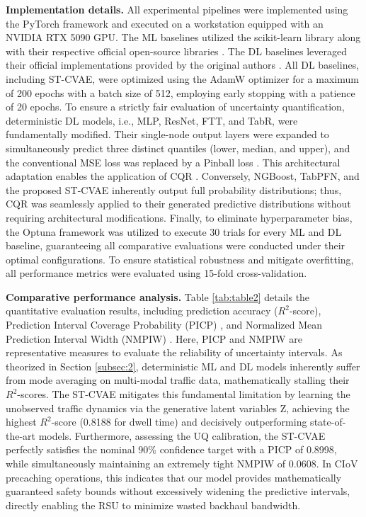 \documentclass[journal]{IEEEtran}
\begin{document}
\textbf{Implementation details.}
All experimental pipelines were implemented using the PyTorch framework and executed on a workstation equipped with an NVIDIA RTX 5090 GPU.
The ML baselines utilized the scikit-learn library along with their respective official open-source libraries \cite{a1, a2, a3}.
The DL baselines leveraged their official implementations provided by the original authors \cite{a4, a5, a6}.
All DL baselines, including ST-CVAE, were optimized using the AdamW optimizer \cite{x9} for a maximum of 200 epochs with a batch size of 512, employing early stopping with a patience of 20 epochs.
To ensure a strictly fair evaluation of uncertainty quantification, deterministic DL models, i.e., MLP, ResNet, FTT, and TabR, were fundamentally modified.
Their single-node output layers were expanded to simultaneously predict three distinct quantiles (lower, median, and upper), and the conventional MSE loss was replaced by a Pinball loss \cite{x10}.
This architectural adaptation enables the application of CQR \cite{x11}.
Conversely, NGBoost, TabPFN, and the proposed ST-CVAE inherently output full probability distributions; thus, CQR was seamlessly applied to their generated predictive distributions without requiring architectural modifications.
Finally, to eliminate hyperparameter bias, the Optuna framework \cite{x12} was utilized to execute 30 trials for every ML and DL baseline, guaranteeing all comparative evaluations were conducted under their optimal configurations.
To ensure statistical robustness and mitigate overfitting, all performance metrics were evaluated using 15-fold cross-validation.

\textbf{Comparative performance analysis.}
Table \ref{tab:table2} details the quantitative evaluation results, including prediction accuracy ($R^{2}$-score), Prediction Interval Coverage Probability (PICP) \cite{x13}, and Normalized Mean Prediction Interval Width (NMPIW) \cite{x14}.
Here, PICP and NMPIW are representative measures to evaluate the reliability of uncertainty intervals.
As theorized in Section \ref{subsec:2}, deterministic ML and DL models inherently suffer from mode averaging on multi-modal traffic data, mathematically stalling their $R^{2}$-scores.
The ST-CVAE mitigates this fundamental limitation by learning the unobserved traffic dynamics via the generative latent variables Z, achieving the highest $R^{2}$-score (0.8188 for dwell time) and decisively outperforming state-of-the-art models.
Furthermore, assessing the UQ calibration, the ST-CVAE perfectly satisfies the nominal 90\% confidence target with a PICP of 0.8998, while simultaneously maintaining an extremely tight NMPIW of 0.0608.
In CIoV precaching operations, this indicates that our model provides mathematically guaranteed safety bounds without excessively widening the predictive intervals, directly enabling the RSU to minimize wasted backhaul bandwidth.
\end{document}
